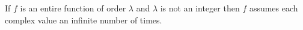 If $f$ is an entire function of order $\lambda$ and $\lambda$ is not an integer then $f$ assumes each complex value an infinite number of times.